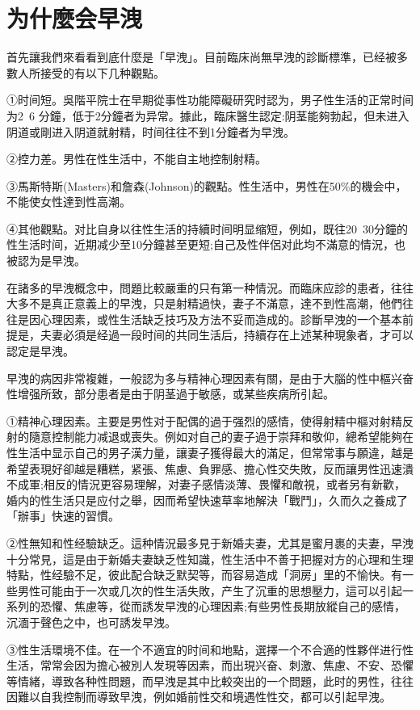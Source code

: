 \documentclass[12pt,UTF8]{ctexbook}
\begin{document}
\section{为什麼会早洩}

首先讓我們來看看到底什麼是「早洩」。目前臨床尚無早洩的診斷標準，已经被多數人所接受的有以下几种觀點。

①时间短。吳階平院士在早期從事性功能障礙研究时認为，男子性生活的正常时间为2~6 分鐘，低于2分鐘者为异常。據此，臨床醫生認定:阴茎能夠勃起，但未进入阴道或剛进入阴道就射精，时间往往不到1分鐘者为早洩。

②控力差。男性在性生活中，不能自主地控制射精。

③馬斯特斯(Masters)和詹森(Johnson)的觀點。性生活中，男性在50\%的機会中，不能使女性達到性高潮。

④其他觀點。对比自身以往性生活的持續时间明显缩短，例如，既往20~30分鐘的性生活时间，近期减少至10分鐘甚至更短;自己及性伴侶对此均不滿意的情況，也被認为是早洩。

在諸多的早洩概念中，問題比較嚴重的只有第一种情況。而臨床应診的患者，往往大多不是真正意義上的早洩，只是射精過快，妻子不滿意，達不到性高潮，他們往往是因心理因素，或性生活缺乏技巧及方法不妥而造成的。診斷早洩的一个基本前提是，夫妻必須是经過一段时间的共同生活后，持續存在上述某种現象者，才可以認定是早洩。

早洩的病因非常複雜，一般認为多与精神心理因素有關，是由于大腦的性中樞兴奋性增强所致，部分患者是由于阴茎過于敏感，或某些疾病所引起。

①精神心理因素。主要是男性对于配偶的過于强烈的感情，使得射精中樞对射精反射的隨意控制能力减退或喪失。例如对自己的妻子過于崇拜和敬仰，總希望能夠在性生活中显示自己的男子漢力量，讓妻子獲得最大的滿足，但常常事与願違，越是希望表現好卻越是糟糕，紧張、焦慮、負罪感、擔心性交失敗，反而讓男性迅速潰不成軍;相反的情況更容易理解，对妻子感情淡薄、畏懼和敵視，或者另有新歡，婚内的性生活只是应付之舉，因而希望快速草率地解決「戰鬥」，久而久之養成了「辦事」快速的習慣。

②性無知和性经驗缺乏。這种情況最多見于新婚夫妻，尤其是蜜月裹的夫妻，早洩十分常見，這是由于新婚夫妻缺乏性知識，性生活中不善于把握对方的心理和生理特點，性经驗不足，彼此配合缺乏默契等，而容易造成「洞房」里的不愉快。有一些男性可能由于一次或几次的性生活失敗，产生了沉重的思想壓力，這可以引起一系列的恐懼、焦慮等，從而誘发早洩的心理因素;有些男性長期放縱自己的感情，沉湎于聲色之中，也可誘发早洩。

③性生活環境不佳。在一个不適宜的时间和地點，選擇一个不合適的性夥伴进行性生活，常常会因为擔心被別人发現等因素，而出現兴奋、刺激、焦慮、不安、恐懼等情緒，導致各种性問題，而早洩是其中比較突出的一个問題，此时的男性，往往因難以自我控制而導致早洩，例如婚前性交和境遇性性交，都可以引起早洩。
\end{document}
